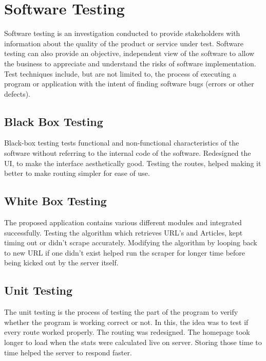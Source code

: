 \chapter{Software Testing}Software testing is an investigation conducted to provide stakeholders with information about the quality of the product or service under test. Software testing can also provide an objective, independent view of the software to allow the business to appreciate and understand the risks of software implementation. Test techniques include, but are not limited to, the process of executing a program or application with the intent of finding software bugs (errors or other defects).


\section{Black Box Testing}

Black-box testing tests functional and non-functional characteristics of the software without referring to the internal code of the software. Redesigned the UI, to make the interface aesthetically good. Testing the routes, helped making it better to make routing simpler for ease of use.


\section{White Box Testing}

The proposed application contains various different modules and integrated successfully. Testing the algorithm which retrieves URL’s and Articles, kept timing out or didn’t scrape accurately. Modifying the algorithm by looping back to new URL if one didn’t exist helped run the scraper for longer time before being kicked out by the server itself.


\section{Unit Testing}

The unit testing is the process of testing the part of the program to verify whether the program is working correct or not. In this, the idea was to test if every route worked properly. The routing was redesigned. The homepage took longer to load when the stats were calculated live on server. Storing those time to time helped the server to respond faster.

